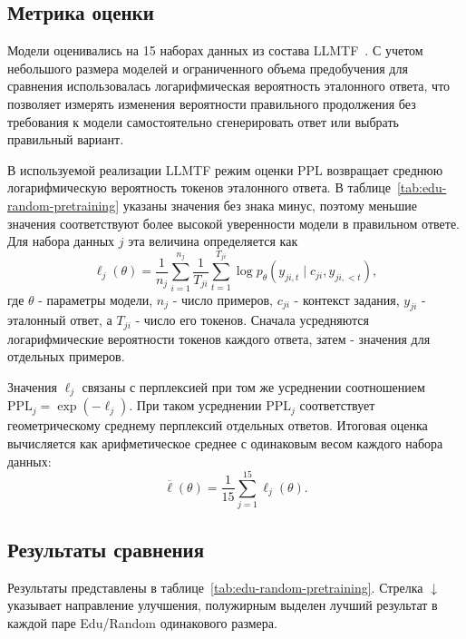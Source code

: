 \documentclass[12pt,a4paper]{article}
\begin{document}
\subsection{Метрика оценки}

Модели оценивались на 15 наборах данных из состава LLMTF~\cite{llmtf}.
С учетом небольшого размера моделей и ограниченного объема предобучения
для сравнения использовалась логарифмическая вероятность эталонного
ответа, что позволяет измерять изменения вероятности правильного
продолжения без требования к модели самостоятельно сгенерировать ответ
или выбрать правильный вариант.

В используемой реализации LLMTF режим оценки PPL возвращает среднюю
логарифмическую вероятность токенов эталонного ответа. В таблице~\ref{tab:edu-random-pretraining} 
указаны значения без знака минус, поэтому меньшие значения соответствуют более высокой уверенности модели в правильном ответе. 
Для набора данных $j$ эта величина определяется как
\begin{equation}
\ell_j(\theta) =
\frac{1}{n_j}\sum_{i=1}^{n_j}
\frac{1}{T_{ji}}\sum_{t=1}^{T_{ji}}
\log p_{\theta}\!\left(
y_{ji,t}\mid c_{ji},y_{ji,<t}
\right),
\label{eq:llmtf-answer-logprob}
\end{equation}
где $\theta$ - параметры модели, $n_j$ - число примеров,
$c_{ji}$ - контекст задания, $y_{ji}$ - эталонный ответ,
а $T_{ji}$ - число его токенов. Сначала усредняются логарифмические
вероятности токенов каждого ответа, затем - значения для отдельных примеров.

Значения $\ell_j$ связаны с перплексией при том же усреднении соотношением
$\mathrm{PPL}_j=\exp(-\ell_j)$. При таком усреднении $\mathrm{PPL}_j$
соответствует геометрическому среднему перплексий отдельных ответов.
Итоговая оценка вычисляется как арифметическое среднее
с одинаковым весом каждого набора данных:
\begin{equation}
\overline{\ell}(\theta)=\frac{1}{15}\sum_{j=1}^{15}\ell_j(\theta).
\label{eq:llmtf-mean-logprob}
\end{equation}

\subsection{Результаты сравнения}

Результаты представлены в таблице~\ref{tab:edu-random-pretraining}.
Стрелка $\downarrow$ указывает направление улучшения, полужирным выделен лучший результат
в каждой паре Edu/Random одинакового размера.
\end{document}
